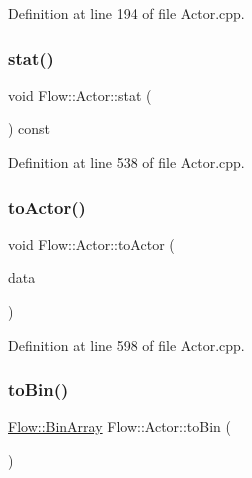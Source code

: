 Definition at line 194 of file Actor.\+cpp.

\hypertarget{class_flow_1_1_actor_a766104232c5b1e55c487d734af749cba}{}\label{class_flow_1_1_actor_a766104232c5b1e55c487d734af749cba} 
\subsubsection{\texorpdfstring{stat()}{stat()}}
{\footnotesize\ttfamily void Flow\+::\+Actor\+::stat (\begin{DoxyParamCaption}{ }\end{DoxyParamCaption}) const}



Definition at line 538 of file Actor.\+cpp.

\hypertarget{class_flow_1_1_actor_ac49323dea55c9a516c9de9a7a29f3af1}{}\label{class_flow_1_1_actor_ac49323dea55c9a516c9de9a7a29f3af1} 
\subsubsection{\texorpdfstring{to\+Actor()}{toActor()}}
{\footnotesize\ttfamily void Flow\+::\+Actor\+::to\+Actor (\begin{DoxyParamCaption}\item[{\hyperlink{class_flow_1_1_bin_array}{Bin\+Array} \&}]{data }\end{DoxyParamCaption})}



Definition at line 598 of file Actor.\+cpp.

\hypertarget{class_flow_1_1_actor_a2252bd864b45e784daaa9f8ecf7ba276}{}\label{class_flow_1_1_actor_a2252bd864b45e784daaa9f8ecf7ba276} 
\subsubsection{\texorpdfstring{to\+Bin()}{toBin()}}
{\footnotesize\ttfamily \hyperlink{class_flow_1_1_bin_array}{Flow\+::\+Bin\+Array} Flow\+::\+Actor\+::to\+Bin (\begin{DoxyParamCaption}{ }\end{DoxyParamCaption})}



